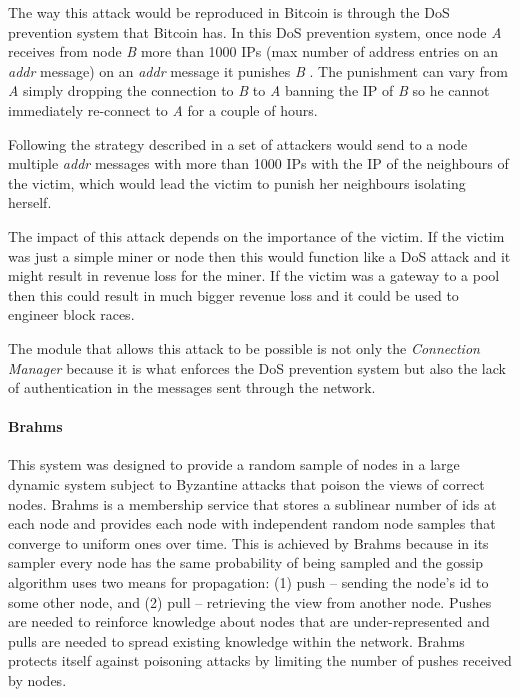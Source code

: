 The way this attack would be reproduced in Bitcoin is through the DoS prevention system that Bitcoin has. In this DoS prevention system, once node \textit{A} receives from node \textit{B} more than 1000 IPs (max number of address entries on an \textit{addr} message) on an \textit{addr} message it punishes \textit{B} \cite{bitcoinwiki}. The punishment can vary from \textit{A} simply dropping the connection to \textit{B} to \textit{A} banning the IP of \textit{B} so he cannot immediately re-connect to \textit{A} for a couple of hours.

Following the strategy described in \cite{jesi2009secure} a set of attackers would send to a node multiple \textit{addr} messages with more than 1000 IPs with the IP of the neighbours of the victim, which would lead the victim to punish her neighbours isolating herself.

The impact of this attack depends on the importance of the victim. If the victim was just a simple miner or node then this would function like a DoS attack and it might result in revenue loss for the miner. If the victim was a gateway to a pool then this could result in much bigger revenue loss and it could be used to engineer block races.

The module that allows this attack to be possible is not only the \textit{Connection Manager} because it is what enforces the DoS prevention system but also the lack of authentication in the messages sent through the network.


\paragraph*{\textbf{Brahms} \cite{bortnikov2009brahms}} This system was designed to provide a random sample of nodes in a large dynamic system subject to Byzantine attacks that poison the views of correct nodes. Brahms is a membership service that stores a sublinear number of ids at each node and provides each node with independent random node samples that converge to uniform ones over time. This is achieved by Brahms because in its sampler every node has the same probability of being sampled and the gossip algorithm uses two means for propagation: (1) push – sending the node’s id to some other node, and (2) pull – retrieving the view from another node. Pushes are needed to reinforce knowledge about nodes that are under-represented and pulls are needed to spread existing knowledge within the network. Brahms protects itself against poisoning attacks by limiting the number of pushes received by nodes.

